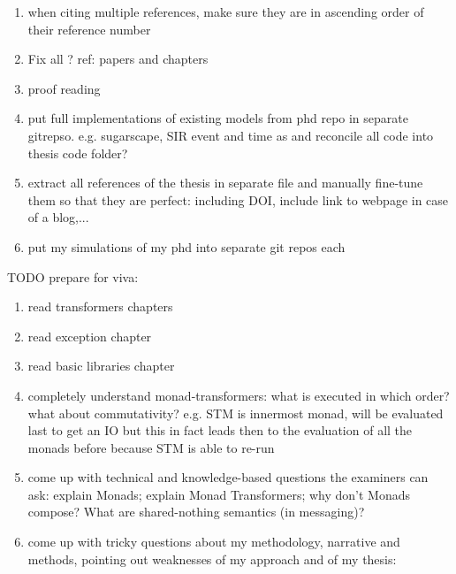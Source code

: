 \documentclass[oneside]{book}
\begin{document}
\begin{enumerate}
	\item when citing multiple references, make sure they are in ascending order of their reference number
	\item Fix all ? ref: papers and chapters
		
	\item proof reading
	
	\item put full implementations of existing models from phd repo in separate gitrepso. e.g. sugarscape, SIR event and time as and reconcile all code into thesis code folder?
	
	\item extract all references of the thesis in separate file and manually fine-tune them so that they are perfect: including DOI, include link to webpage in case of a blog,...
	
	\item put my simulations of my phd into separate git repos each
\end{enumerate}

TODO prepare for viva:
\begin{enumerate}
	\item read transformers chapters
	
	\item read exception chapter

	\item read basic libraries chapter	
	
	\item completely understand monad-transformers: what is executed in which order? what about commutativity? e.g. STM is innermost monad, will be evaluated last to get an IO but this in fact leads then to the evaluation of all the monads before because STM is able to re-run
	
	\item come up with technical and knowledge-based questions the examiners can ask: explain Monads; explain Monad Transformers; why don't Monads compose? What are shared-nothing semantics (in messaging)? 
	
	\item come up with tricky questions about my methodology, narrative and methods, pointing out weaknesses of my approach and of my thesis:
\end{enumerate}

\end{document}
